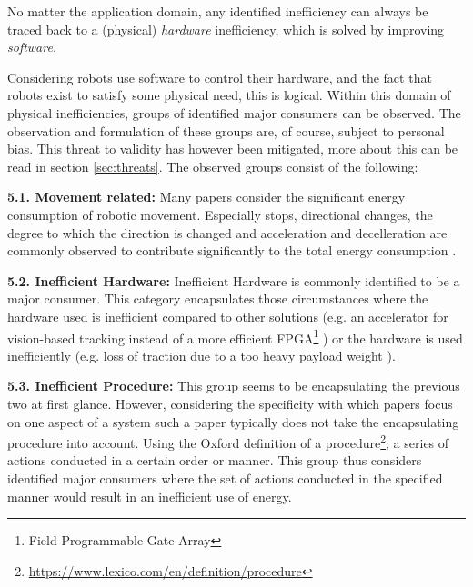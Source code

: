 No matter the application domain, any identified inefficiency can always be traced back to a (physical) \textit{hardware} inefficiency, 
which is solved by improving \textit{software}.

Considering robots use software to control their hardware, and the fact that robots exist to satisfy some physical need, this is logical.
Within this domain of physical inefficiencies, groups of identified major consumers can be observed.
The observation and formulation of these groups are, of course, subject to personal bias.
This threat to validity has however been mitigated, more about this can be read in section \ref{sec:threats}.
The observed groups consist of the following:

\vspace{2mm} \noindent \textbf{5.1. Movement related:}
Many papers consider the significant energy consumption of robotic movement. 
Especially stops, directional changes, the degree to which the direction is changed and acceleration and decelleration are commonly observed
to contribute significantly to the total energy consumption 
\cite{mei2005energy_consumers_identified, mei2006mobile_exploration, xie2018mecanum_wheel,kaitwanidvilai2020industrial_robot_cycle_time}.

\vspace{2mm} \noindent \textbf{5.2. Inefficient Hardware:}
Inefficient Hardware is commonly identified to be a major consumer. 
This category encapsulates those circumstances where the hardware used is inefficient compared to other solutions 
(e.g. an accelerator for vision-based tracking instead of a more efficient FPGA\footnote{Field Programmable Gate Array} \cite{cheng2018FPGA_image_recognition})
or the hardware is used inefficiently (e.g. loss of traction due to a too heavy payload weight \cite{kim2016firefighting_robot}).

\vspace{2mm} \noindent \textbf{5.3. Inefficient Procedure:}
This group seems to be encapsulating the previous two at first glance. 
However, considering the specificity with which papers focus on one aspect of a system such a paper typically does not take the encapsulating procedure into account.
Using the Oxford definition of a procedure\footnote{\url{https://www.lexico.com/en/definition/procedure}}; a series of actions conducted in a certain order or manner.
This group thus considers identified major consumers where the set of actions conducted in the specified manner would result in an inefficient use of energy.

